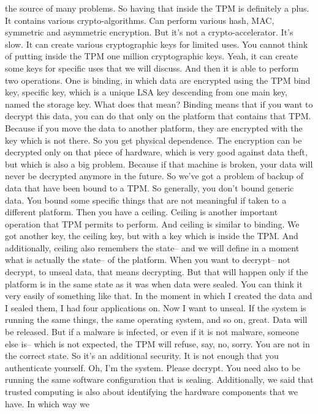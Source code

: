  the source of many problems. So having that inside the TPM is definitely a
 plus. It contains various crypto-algorithms. Can perform various hash, MAC,
 symmetric and asymmetric encryption. But it's not a crypto-accelerator. It's
 slow. It can create various cryptographic keys for limited uses. You cannot
 think of putting inside the TPM one million cryptographic keys. Yeah, it can
 create some keys for specific uses that we will discuss. And then it is able
 to perform two operations. One is binding, in which data are encrypted using
 the TPM bind key, specific key, which is a unique LSA key descending from one
 main key, named the storage key. What does that mean? Binding means that if
 you want to decrypt this data, you can do that only on the platform that
 contains that TPM. Because if you move the data to another platform, they are
 encrypted with the key which is not there. So you get physical dependence. The
 encryption can be decrypted only on that piece of hardware, which is very good
 against data theft, but which is also a big problem. Because if that machine
 is broken, your data will never be decrypted anymore in the future. So we've
 got a problem of backup of data that have been bound to a TPM. So generally,
 you don't bound generic data. You bound some specific things that are not
 meaningful if taken to a different platform. Then you have a ceiling. Ceiling
 is another important operation that TPM permits to perform. And ceiling is
 similar to binding. We got another key, the ceiling key, but with a key which
 is inside the TPM. And additionally, ceiling also remembers the state-- and we
 will define in a moment what is actually the state-- of the platform. When you
 want to decrypt-- not decrypt, to unseal data, that means decrypting. But that
 will happen only if the platform is in the same state as it was when data were
 sealed. You can think it very easily of something like that. In the moment in
 which I created the data and I sealed them, I had four applications on. Now I
 want to unseal. If the system is running the same things, the same operating
 system, and so on, great. Data will be released. But if a malware is infected,
 or even if it is not malware, someone else is-- which is not expected, the TPM
 will refuse, say, no, sorry. You are not in the correct state. So it's an
 additional security. It is not enough that you authenticate yourself. Oh, I'm
 the system. Please decrypt. You need also to be running the same software
 configuration that is sealing. Additionally, we said that trusted computing is
 also about identifying the hardware components that we have. In which way we
